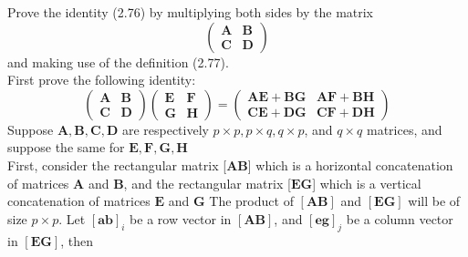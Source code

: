 \documentclass{article}
\begin{document}

Prove the identity (2.76) by multiplying both sides by the matrix
$$
\left(\begin{array}{ll}
\mathbf{A} & \mathbf{B} \\
\mathbf{C} & \mathbf{D}
\end{array}\right)
$$
and making use of the definition (2.77).\\
First prove the following identity:
$$
\left(\begin{array}{ll}
\mathbf{A} & \mathbf{B} \\
\mathbf{C} & \mathbf{D}
\end{array}\right)\left(\begin{array}{ll}
\mathbf{E} & \mathbf{F} \\
\mathbf{G} & \mathbf{H}
\end{array}\right)=\left(\begin{array}{ll}
\mathbf{A E}+\mathbf{B G} & \mathbf{A F}+\mathbf{B H} \\
\mathbf{C E}+\mathbf{D G} & \mathbf{C F}+\mathbf{D H}
\end{array}\right)
$$
Suppose $\mathbf{A}, \mathbf{B}, \mathbf{C}, \mathbf{D}$ are respectively $p \times p, p \times q, q \times p$, and $q \times q$ matrices, and suppose the same for $\mathbf{E}, \mathbf{F}, \mathbf{G}, \mathbf{H}$\\First, consider the rectangular matrix [$\mathbf{AB}$] which is a horizontal concatenation of matrices $\mathbf{A}$ and $\mathbf{B}$, and the rectangular matrix [$\mathbf{EG}$] which is a vertical concatenation of matrices $\mathbf{E}$ and $\mathbf{G}$
The product of $[\mathbf{A B}]$ and $[\mathbf{E G}]$ will be of size $p \times p$.
Let $[\mathbf{a b}]_{i}$ be a row vector in $[\mathbf{A B}]$, and $[\mathbf{e g}]_{j}$ be a column vector in $[\mathbf{E G}]$, then
\end{document}
